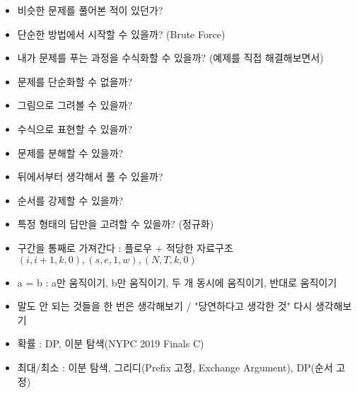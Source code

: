 \documentclass[landscape, 8pt, a4paper, twocolumn]{extarticle} %
\begin{document}
\begin{itemize}
    \setlength\itemsep{0.1em}
    \item 비슷한 문제를 풀어본 적이 있던가?
    \item 단순한 방법에서 시작할 수 있을까? (Brute Force)
    \item 내가 문제를 푸는 과정을 수식화할 수 있을까? (예제를 직접 해결해보면서)
    \item 문제를 단순화할 수 없을까?
    \item 그림으로 그려볼 수 있을까?
    \item 수식으로 표현할 수 있을까?
    \item 문제를 분해할 수 있을까?
    \item 뒤에서부터 생각해서 풀 수 있을까?
    \item 순서를 강제할 수 있을까?
    \item 특정 형태의 답만을 고려할 수 있을까? (정규화)
    \item 구간을 통째로 가져간다 : 플로우 + 적당한 자료구조 $(i,i+1,k,0),(s,e,1,w),(N,T,k,0)$
    \item a = b : a만 움직이기, b만 움직이기, 두 개 동시에 움직이기, 반대로 움직이기
    \item 말도 안 되는 것들을 한 번은 생각해보기 / "당연하다고 생각한 것" 다시 생각해보기
    \item 확률 : DP, 이분 탐색(NYPC 2019 Finals C)
    \item 최대/최소 : 이분 탐색, 그리디(Prefix 고정, Exchange Argument), DP(순서 고정)
\end{itemize}
\end{document}
